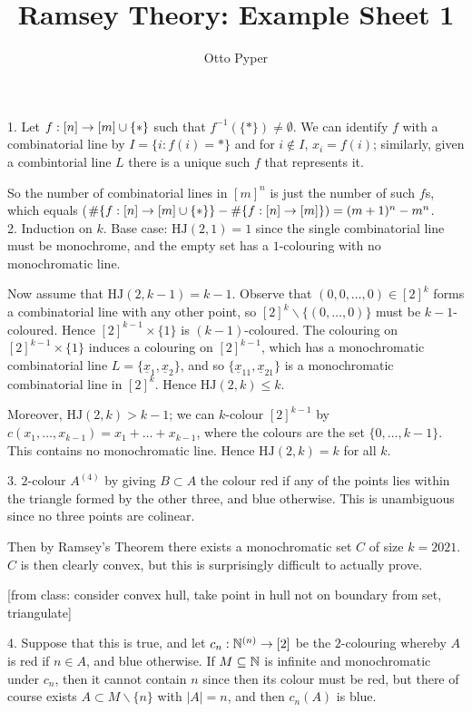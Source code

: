 \documentclass[10pt]{article}
\title{Ramsey Theory: Example Sheet 1}
\author{Otto Pyper}
\date{}
\newcommand{\hj}{\textrm{HJ}}
\begin{document}
\maketitle

1. Let $f : [n] \rightarrow [m]\cup\{\ast\}$ such that $f^{-1}(\{\ast\})\ne\emptyset$. We can identify $f$ with a combinatorial line by $I = \{i : f(i) = \ast\}$ and for $i\not\in I$, $x_i = f(i)$; similarly, given a combintorial line $L$ there is a unique such $f$ that represents it.

So the number of combinatorial lines in $[m]^n$ is just the number of such $f$s, which equals ($\#\{f:[n]\rightarrow [m]\cup\{\ast\}\} - \# \{f:[n]\rightarrow [m]\}) = (m+1)^n - m^n$.\ \\

2. Induction on $k$. Base case: $\hj(2,1) = 1$ since the single combinatorial line must be monochrome, and the empty set has a $1$-colouring with no monochromatic line.

Now assume that $\hj(2,k-1) = k-1$. Observe that $(0,0,\dots,0)\in [2]^k$ forms a combinatorial line with any other point, so $[2]^k \backslash \{(0,\dots,0)\}$ must be $k-1$-coloured. Hence $[2]^{k-1}\times\{1\}$ is $(k-1)$-coloured. The colouring on $[2]^{k-1}\times \{1\}$ induces a colouring on $[2]^{k-1}$, which has a monochromatic combinatorial line $L = \{\underline{x}_1,\underline{x}_2\}$, and so $\{\underline{x}_11,\underline{x}_21\}$ is a monochromatic combinatorial line in $[2]^{k}$. Hence $\hj(2,k) \le k$.

Moreover, $\hj(2,k) > k-1$; we can $k$-colour $[2]^{k-1}$ by $c(x_1,\dots,x_{k-1}) = x_1 + \dots + x_{k-1}$, where the colours are the set $\{0,\dots,k-1\}$. This contains no monochromatic line. Hence $\hj(2,k) = k$ for all $k$.

3. $2$-colour $A^{(4)}$ by giving $B\subset A$ the colour red if any of the points lies within the triangle formed by the other three, and blue otherwise. This is unambiguous since no three points are colinear.

Then by Ramsey's Theorem there exists a monochromatic set $C$ of size $k = 2021$. $C$ is then clearly convex, but this is surprisingly difficult to actually prove.

[from class: consider convex hull, take point in hull not on boundary from set, triangulate]

4. Suppose that this is true, and let $c_n : \mathbb{N}^{(n)}\rightarrow [2]$ be the $2$-colouring whereby $A$ is red if $n \in A$, and blue otherwise. If $M \subseteq \mathbb{N}$ is infinite and monochromatic under $c_n$, then it cannot contain $n$ since then its colour must be red, but there of course exists $A\subset M\backslash \{n\}$ with $|A| = n$, and then $c_n(A)$ is blue.
\end{document}
